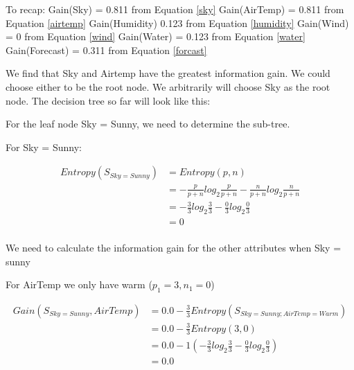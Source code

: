 \documentclass[10pt,a4paper]{article}
\begin{document}
{{{{{{{{{{To recap: 
\newline
Gain(Sky) = 0.811 from Equation \ref{sky} \newline
Gain(AirTemp) = 0.811 from Equation \ref{airtemp} \newline
Gain(Humidity) 0.123 from Equation \ref{humidity} \newline
Gain(Wind) = 0 from Equation \ref{wind} \newline
Gain(Water) = 0.123 from Equation \ref{water} \newline
Gain(Forecast) = 0.311 from Equation \ref{forcast} \newline

We find that Sky and Airtemp have the greatest information gain. We could choose either to be the root node. We arbitrarily will choose Sky as the root node. The decision tree so far will look like this:



For the leaf node Sky = Sunny, we need to determine the sub-tree.

For Sky = Sunny:

\begin{equation}
\begin{split}
Entropy(S_{Sky=Sunny}) &= Entropy(p,n) \\
                       &= -\frac{p}{p+n}log_2\frac{p}{p+n} - \frac{n}{p+n}log_2\frac{n}{p+n}  \\
                       &= -\frac{3}{3} log_2\frac{3}{3} -\frac{0}{3} log_2\frac{0}{3} \\
                       &= 0   \\
\end{split}
\end{equation}

We need to calculate the information gain for the other attributes when Sky = sunny

For AirTemp we only have warm ($p_1=3,n_1=0$)

\begin{equation}
\begin{split}
Gain(S_{Sky=Sunny},AirTemp) &= 0.0 - \frac{3}{3} Entropy(S_{Sky=Sunny;AirTemp=Warm} )\\
          &= 0.0 - \frac{3}{3} Entropy(3,0) \\
          &= 0.0 - 1( -\frac{3}{3} log_2\frac{3}{3} -\frac{0}{3} log_2\frac{0}{3} )  \\
          &= 0.0 \\
\end{split}
\end{equation}

}}}}}}}}}}
\end{document}
